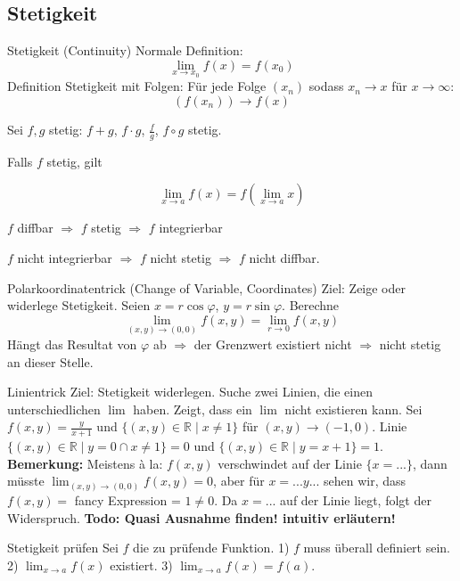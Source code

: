 \subsection{Stetigkeit}

\begin{Definition}{Stetigkeit (Continuity)}{}
    Normale Definition:
    \[
    \lim_{x\rightarrow x_0} f(x) = f(x_0)
    \]
    Definition Stetigkeit mit Folgen: Für jede Folge $(x_n)$ sodass $x_n \rightarrow x$ für $x\rightarrow \infty $:
    \[
    (f(x_n)) \rightarrow f(x)
    \]
\end{Definition}

Sei $f,g$ stetig: $f+g$, $f\cdot g$, $\frac{f}{g}$, $f \circ g$ stetig.

Falls $f$ stetig, gilt

\[
    \lim_{x \rightarrow a} f(x) = f(\lim_{x\rightarrow a} x)
\]

$f$ diffbar $\Rightarrow$ $f$ stetig $\Rightarrow$ $f$ integrierbar

$f$ nicht integrierbar $\Rightarrow$ $f$ nicht stetig $\Rightarrow$ $f$ nicht diffbar.\\

\begin{Rezept}{Polarkoordinatentrick (Change of Variable, Coordinates)}{}
    Ziel: Zeige oder widerlege Stetigkeit. Seien $x=r\cos \varphi$, $y=r\sin \varphi$. Berechne
    \[
    \lim_{(x, y) \rightarrow (0,0)} f(x, y) = \lim_{r \rightarrow 0} f(x, y)
    \]
    Hängt das Resultat von $\varphi$ ab $\Rightarrow$ der Grenzwert existiert nicht $\Rightarrow$ nicht stetig an dieser Stelle.
\end{Rezept}

\begin{Rezept}{Linientrick}{}
    Ziel: Stetigkeit widerlegen. Suche zwei Linien, die einen unterschiedlichen $\lim$ haben. Zeigt, dass ein $\lim$ nicht existieren kann.
    Sei $f(x, y)=\frac{y}{x+1}$ und $\{(x, y) \in \mathbb{R} \mid x \neq 1\}$ für $(x, y) \rightarrow (-1, 0)$. Linie $\{(x, y) \in \mathbb{R} \mid y=0\cap x \neq 1\}=0$ und $\{(x, y) \in \mathbb{R} \mid y=x+1\}=1$.\\
    
    \textbf{Bemerkung:} Meistens à la: $f(x,y)$ verschwindet auf der Linie $\{x=...\}$, dann müsste $\lim_{(x,y)\rightarrow(0,0)} f(x,y) = 0$, aber für $x=...y...$ sehen wir, dass
    $f(x,y) =$ fancy Expression = $1 \neq 0$. Da $x=...$ auf der Linie liegt, folgt der Widerspruch. \textbf{Todo: Quasi Ausnahme finden! intuitiv erläutern!}
\end{Rezept}

\begin{Rezept}{Stetigkeit prüfen}{}
    Sei $f$ die zu prüfende Funktion. 1) $f$ muss überall definiert sein. 2) $\lim_{x \rightarrow a} f(x)$ existiert. 3) $\lim_{x \rightarrow a} f(x) = f(a)$.
\end{Rezept}
